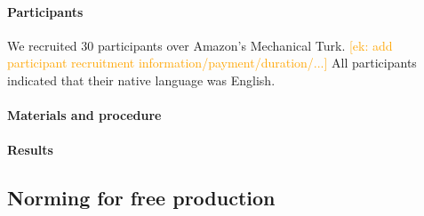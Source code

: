 \documentclass[a4paper,man,floatsintext,natbib,donotrepeattitle]{apa6}
\newcommand{\ek}[1]{\textcolor{Orange}{[ek: #1]}}
\begin{document}

\paragraph{Participants}
We recruited 30 participants over Amazon's Mechanical Turk. \ek{add participant recruitment information/payment/duration/...} All participants indicated that their native language was English.

\paragraph{Materials and procedure}

\paragraph{Results}

\subsection{Norming for free production}
\label{freeprodnorming}






\end{document}
